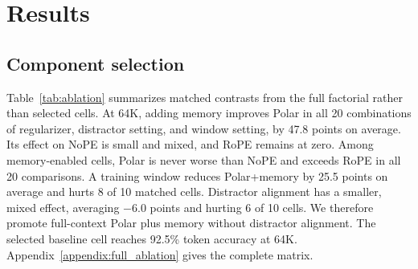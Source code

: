 \documentclass{article}
\begin{document}
\section{Results}

\subsection{Component selection}

Table~\ref{tab:ablation} summarizes matched contrasts from the full factorial rather than selected cells. At 64K, adding memory improves Polar in all 20 combinations of regularizer, distractor setting, and window setting, by 47.8 points on average. Its effect on NoPE is small and mixed, and RoPE remains at zero. Among memory-enabled cells, Polar is never worse than NoPE and exceeds RoPE in all 20 comparisons. A training window reduces Polar+memory by 25.5 points on average and hurts 8 of 10 matched cells. Distractor alignment has a smaller, mixed effect, averaging $-6.0$ points and hurting 6 of 10 cells. We therefore promote full-context Polar plus memory without distractor alignment. The selected baseline cell reaches 92.5\% token accuracy at 64K. Appendix~\ref{appendix:full_ablation} gives the complete matrix.

\begin{table}[t]
\centering
\small
\setlength{\tabcolsep}{3.4pt}
\caption{Matched contrasts across the 120-cell, 1B-token factorial. Values are percentage-point changes in teacher-forced five-token accuracy at 64K. Each row holds all other factorial axes fixed. ``Positive'' excludes one numerical tie in the Polar--NoPE comparison.}
\label{tab:ablation}
\end{table}
\end{document}
